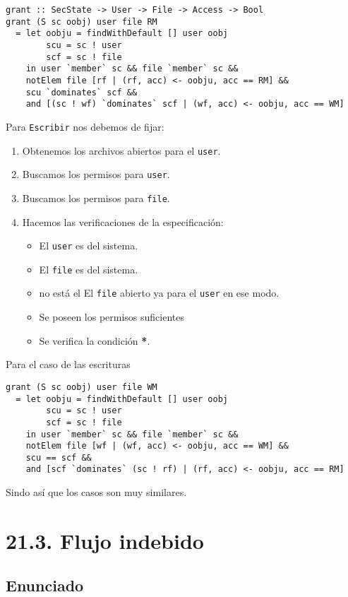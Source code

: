 \documentclass[11pt]{article}
\begin{document}
\begin{lstlisting}
grant :: SecState -> User -> File -> Access -> Bool
grant (S sc oobj) user file RM
  = let oobju = findWithDefault [] user oobj
        scu = sc ! user
        scf = sc ! file 
    in user `member` sc && file `member` sc &&
    notElem file [rf | (rf, acc) <- oobju, acc == RM] &&
    scu `dominates` scf &&
    and [(sc ! wf) `dominates` scf | (wf, acc) <- oobju, acc == WM]
\end{lstlisting}

Para \texttt{Escribir} nos debemos de fijar:
\begin{enumerate}
    \item Obtenemos los archivos abiertos para el \texttt{user}.
    \item Buscamos los permisos para \texttt{user}. 
    \item Buscamos los permisos para \texttt{file}. 
    \item Hacemos las verificaciones de la especificación:
        \begin{itemize}
            \item El \texttt{user} es del sistema.
            \item El \texttt{file} es del sistema.
            \item no está el El \texttt{file} abierto ya para el \texttt{user} en ese modo.
            \item Se poseen los permisos suficientes
            \item Se verifica la condición \textbf{*}. 
        \end{itemize}
\end{enumerate}

\noindent Para el caso de las escrituras
\begin{lstlisting}
grant (S sc oobj) user file WM
  = let oobju = findWithDefault [] user oobj
        scu = sc ! user
        scf = sc ! file 
    in user `member` sc && file `member` sc &&
    notElem file [wf | (wf, acc) <- oobju, acc == WM] &&
    scu == scf &&
    and [scf `dominates` (sc ! rf) | (rf, acc) <- oobju, acc == RM]    
\end{lstlisting}

Sindo así que los casos son muy similares.

\section*{21.3. Flujo indebido}
\subsection*{Enunciado}
\end{document}
